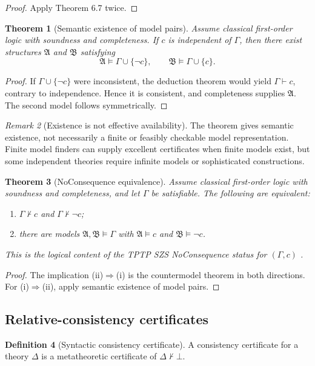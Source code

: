 \documentclass[11pt]{article}
\newtheorem{theorem}{Theorem}[section]
\theoremstyle{definition}
\newtheorem{definition}[theorem]{Definition}
\theoremstyle{remark}
\newtheorem{remark}[theorem]{Remark}
\newcommand{\Gammaa}{\Gamma}
\newcommand{\bottomf}{\bot}
\begin{document}
\begin{proof}
Apply Theorem 6.7 twice.
\end{proof}

\begin{theorem}[Semantic existence of model pairs]
Assume classical first-order logic with soundness and completeness. If $c$ is independent of $\Gammaa$, then there exist structures $\mathfrak A$ and $\mathfrak B$ satisfying
\[
\mathfrak A\models\Gammaa\cup\{\neg c\},
\qquad
\mathfrak B\models\Gammaa\cup\{c\}.
\]
\end{theorem}

\begin{proof}
If $\Gammaa\cup\{\neg c\}$ were inconsistent, the deduction theorem would yield $\Gammaa\vdash c$, contrary to independence. Hence it is consistent, and completeness supplies $\mathfrak A$. The second model follows symmetrically.
\end{proof}

\begin{remark}[Existence is not effective availability]
The theorem gives semantic existence, not necessarily a finite or feasibly checkable model representation. Finite model finders can supply excellent certificates when finite models exist, but some independent theories require infinite models or sophisticated constructions.
\end{remark}

\begin{theorem}[NoConsequence equivalence]
Assume classical first-order logic with soundness and completeness, and let $\Gammaa$ be satisfiable. The following are equivalent:
\begin{enumerate}[label=(\roman*)]
  \item $\Gammaa\nvdash c$ and $\Gammaa\nvdash\neg c$;
  \item there are models $\mathfrak A,\mathfrak B\models\Gammaa$ with $\mathfrak A\models c$ and $\mathfrak B\models\neg c$.
\end{enumerate}
This is the logical content of the TPTP SZS \emph{NoConsequence} status for $(\Gammaa,c)$ \cite{SZS}.
\end{theorem}

\begin{proof}
The implication (ii)$\Rightarrow$(i) is the countermodel theorem in both directions. For (i)$\Rightarrow$(ii), apply semantic existence of model pairs.
\end{proof}

\subsection{Relative-consistency certificates}
\begin{definition}[Syntactic consistency certificate]
A consistency certificate for a theory $\Delta$ is a metatheoretic certificate of $\Delta\nvdash\bottomf$.
\end{definition}
\end{document}
